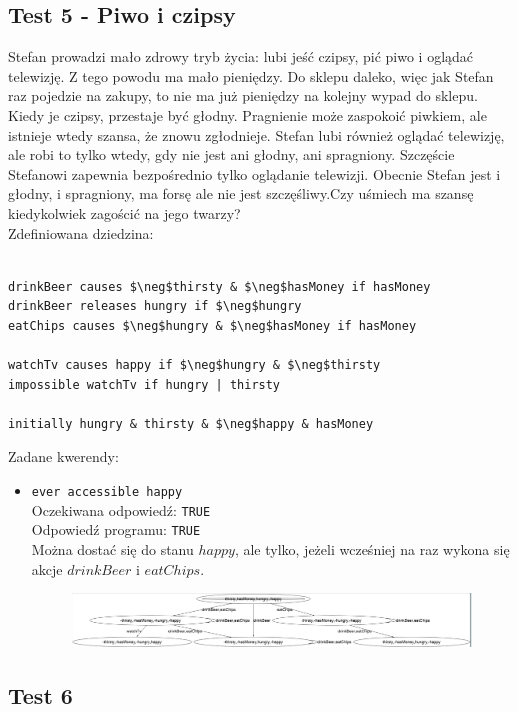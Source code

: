 \documentclass{article}
\begin{document}
\subsection{Test 5 - Piwo i czipsy}
Stefan prowadzi mało zdrowy tryb życia: lubi jeść czipsy, pić piwo i oglądać telewizję. Z tego powodu ma mało pieniędzy. Do sklepu daleko, więc jak Stefan raz pojedzie na zakupy, to nie ma już pieniędzy na kolejny wypad do sklepu. Kiedy je czipsy, przestaje być głodny. Pragnienie może zaspokoić piwkiem, ale istnieje wtedy szansa, że znowu zgłodnieje. Stefan lubi również oglądać telewizję, ale robi to tylko wtedy, gdy nie jest ani głodny, ani spragniony. Szczęście Stefanowi zapewnia bezpośrednio tylko oglądanie telewizji. Obecnie Stefan jest i głodny, i spragniony, ma forsę ale nie jest szczęśliwy.Czy uśmiech ma szansę kiedykolwiek zagościć na jego twarzy?\\
Zdefiniowana dziedzina:
\bigskip
{}
\begin{lstlisting}[mathescape=true]

drinkBeer causes $\neg$thirsty & $\neg$hasMoney if hasMoney
drinkBeer releases hungry if $\neg$hungry
eatChips causes $\neg$hungry & $\neg$hasMoney if hasMoney

watchTv causes happy if $\neg$hungry & $\neg$thirsty
impossible watchTv if hungry | thirsty

initially hungry & thirsty & $\neg$happy & hasMoney
\end{lstlisting}
\vspace{1cm}
Zadane kwerendy:
\begin{itemize}
	\item {\large\texttt{ever accessible happy}}\\
	Oczekiwana odpowiedź: \texttt{TRUE}\\
	Odpowiedź programu: \texttt{TRUE}\\
	Można dostać się do stanu $happy$, ale tylko, jeżeli wcześniej na raz wykona się akcje $drinkBeer$ i $eatChips$.
	\begin{figure}[H]
		\centering
		\includegraphics[scale=0.3]{stefan1}
	\end{figure}
\end{itemize}

\newpage
\subsection{Test 6}
\end{document}
